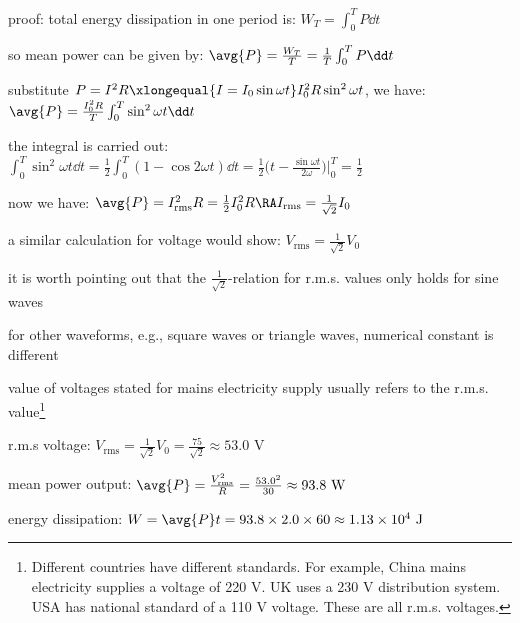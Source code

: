 \begin{compactenum}
	\item[proof:] total energy dissipation in one period is: $W_T = \int^T_0 P \dd  t$
	
	\eqyskip
	
	so mean power can be given by: $\avg{P} = \frac{W_T}{T} = \frac{1}{T} \int^T_0 P \dd t$
	
	\eqyskip
	
	substitute $P=I^2 R \xlongequal{I=I_0\sin\omega t} I^2_0 R \sin^2 \omega t$, we have: $\avg{P} = \frac{I^2_0 R}{T} \int^T_0 \sin^2 \omega t \dd t$
	
	\eqyskip
	
	the integral is carried out: $\int^T_0 \sin^2 \omega t \dd t = \frac{1}{2} \int_0^T (1-\cos2 \omega t) \dd t = \frac{1}{2} \Big(t - \frac{\sin \omega t}{2\omega} \Big) \Bigg|_0^T = \frac{1}{2}$
	
	\eqyskip
	
	now we have: $\avg{P} = I_\text{rms}^2 R = \frac{1}{2} I_0^2 R \RA I_\text{rms} = \frac{1}{\sqrt{2}} I_0$
	
	a similar calculation for voltage would show: $V_\text{rms} = \frac{1}{\sqrt{2}} V_0$  \eoe
\end{compactenum}

\cmt it is worth pointing out that the $\tfrac{1}{\sqrt{2}}$-relation for r.m.s. values only holds for sine waves

for other waveforms, e.g., square waves or triangle waves, numerical constant is different

\cmt value of voltages stated for mains electricity supply usually refers to the r.m.s. value\footnote{Different countries have different standards. For example, China mains electricity supplies a voltage of 220 V. UK uses a 230 V distribution system. USA has national standard of a 110 V voltage. These are all r.m.s. voltages.}


\sol r.m.s voltage: $V_\text{rms} = \frac{1}{\sqrt{2}} V_0 = \frac{75}{\sqrt{2}} \approx 53.0 \text{ V}$

\eqyskip

mean power output: $\avg{P} = \frac{V^2_\text{rms}}{R} = \frac{53.0^2}{30} \approx 93.8 \text{ W}$

energy dissipation: $W = \avg{P} t = 93.8 \times 2.0 \times 60 \approx 1.13 \times 10^4 \text{ J}$ \eoe

